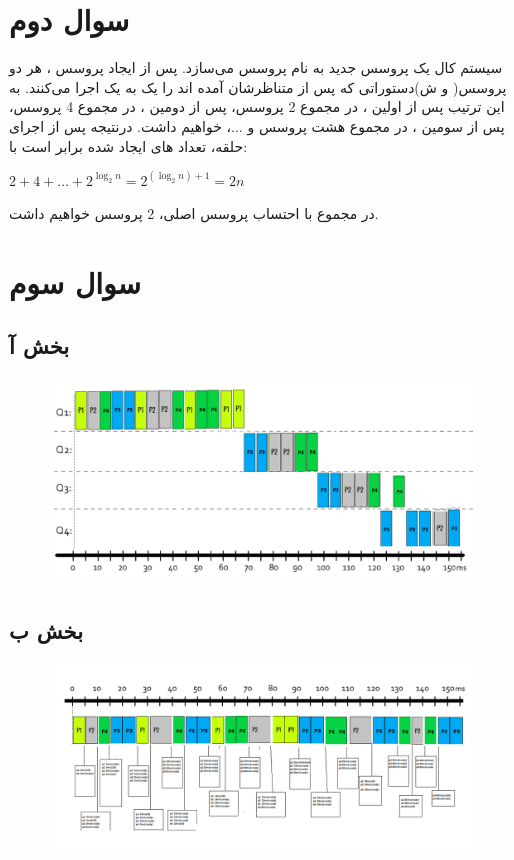 \documentclass{article}
\begin{document}
\section{سوال دوم}
\indent
سیستم کال  یک پروسس جدید به نام پروسس  می‌سازد. پس از ایجاد پروسس ، هر دو پروسس( و ش)دستوراتی که پس از  متناظرشان آمده اند را یک به یک اجرا می‌کنند. به این ترتیب پس از اولین ، در مجموع 2 پروسس، پس از دومین ، در مجموع 4 پروسس، پس از سومین ، در مجموع هشت پروسس و $\ldots$، خواهیم داشت. درنتیجه پس از اجرای حلقه، تعداد های ایجاد شده برابر است با:

\begin{center}
$
2+4+\ldots+2^{\log_2 n}=2^{(\log_2 n)+1}=2n
$
\end{center}
در مجموع با احتساب پروسس  اصلی، 2 پروسس خواهیم داشت.

\section{سوال سوم}
\subsection{بخش آ}
\begin{figure}[H]
    \centering
    \includegraphics[width=1\textwidth]{figures/Template-Q4-1.png}
    \caption{}
    \label{fig:fig1}
\end{figure}
\subsection{بخش ب}
\begin{figure}[H]
    \centering
    \includegraphics[width=1\textwidth]{figures/Template-Q4-2.png}
    \caption{}
    \label{fig:fig1}
\end{figure}
\end{document}
